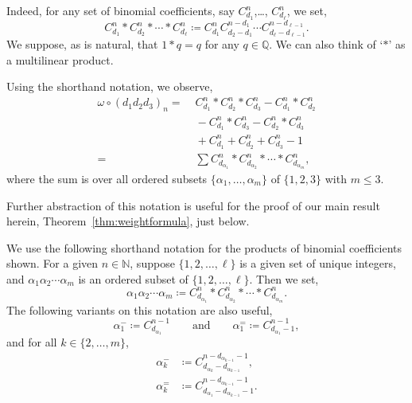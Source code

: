\documentclass[5p,twocolumn]{elsarticle}
\begin{document}
Indeed, for any set of binomial coefficients, say $C_{d_1}^n$,\ldots, $C_{d_\ell}^n$, we set,
\begin{equation}
  C^n_{d_1}\ast C^n_{d_2}\ast\cdots\ast C^n_{d_\ell}\coloneqq C^n_{d_1}C^{n-d_1}_{d_2-d_1}\cdots C^{n-d_{\ell-1}}_{d_\ell-d_{\ell-1}}. 
\end{equation}
We suppose, as is natural, that $1\ast q=q$ for any $q\in\mathbb Q$. We can also think of `$\ast$' as a multilinear product.
%
\begin{example}\label{ex:setupordering}
  Using the shorthand notation, we observe,
  \begin{align*}
    \omega\circ(d_1d_2d_3)_n=&\;C_{d_1}^{n}\ast C^{n}_{d_2}\ast C^{n}_{d_3}-C_{d_1}^{n}\ast C^{n}_{d_2}\\
                            &\;-C_{d_1}^{n}\ast C^{n}_{d_3}-C_{d_2}^{n}\ast C^{n}_{d_3}\\
                            &\;+C^n_{d_1}+C^n_{d_2}+C^n_{d_3}-1\\
                           =&\;\sum C_{d_{\alpha_1}}^n\ast C_{d_{\alpha_2}}^n\ast\cdots\ast C_{d_{\alpha_m}}^n,
  \end{align*}
  where the sum is over all ordered subsets $\{\alpha_1,\ldots,\alpha_m\}$ of $\{1,2,3\}$ with $m\leqslant3$.
\end{example}
%
Further abstraction of this notation is useful for the proof of our main result herein, Theorem~\ref{thm:weightformula}, just below.
%
\begin{definition}\label{def:shorthandbinomials}
  We use the following shorthand notation for the products of binomial coefficients shown.
  For a given $n\in\mathbb N$, suppose $\{1,2,\ldots,\ell\}$ is a given set of unique integers,
  and $\alpha_1\alpha_2\cdots\alpha_m$ is an ordered subset of $\{1,2,\ldots,\ell\}$.
  Then we set,
  \begin{equation*}
    \alpha_1\alpha_2\cdots\alpha_m\coloneqq C_{d_{\alpha_1}}^n\ast C_{d_{\alpha_2}}^n\ast\cdots\ast C_{d_{\alpha_m}}^n.
  \end{equation*}
  The following variants on this notation are also useful, 
  \begin{equation*}
    \alpha_1^-\coloneqq C_{d_{\alpha_1}}^{n-1}\qquad\text{and}\qquad\alpha_1^=\coloneqq C_{d_{\alpha_1}-1}^{n-1},
  \end{equation*}
  and for all $k\in\{2,\ldots,m\}$, 
  \begin{align*}
    \alpha_k^-&\coloneqq C_{d_{\alpha_k}-d_{\alpha_{k-1}}}^{n-d_{\alpha_{k-1}}-1}, \\
    \alpha_k^=&\coloneqq C_{d_{\alpha_1}-d_{\alpha_{k-1}}-1}^{n-d_{\alpha_{k-1}}-1}.
  \end{align*}
\end{definition}
\end{document}
